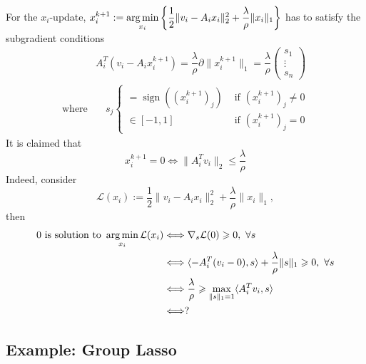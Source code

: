For the $x_i$-update, $x_i^{k+1} := \operatorname*{arg\,min}\limits_{x_i} \left\{ \dfrac{1}{2} \lVert v_i - A_ix_i \rVert_2^2 + \dfrac{\lambda}{\rho} \lVert x_i \rVert_1 \right\}$ has to satisfy the subgradient conditions
\begin{align*}
    & A_i^T (v_i-A_ix_i^{k+1}) = \dfrac{\lambda}{\rho} \partial \lVert x_i^{k+1} \rVert_1 = \dfrac{\lambda}{\rho} \begin{pmatrix} s_1 \\ \vdots \\ s_n \end{pmatrix} \\
    \text{where} & \quad s_j \begin{cases} = \operatorname{sign}((x_i^{k+1})_j) & \text{ if } (x_i^{k+1})_j \neq 0 \\ \in [-1, 1] & \text{ if } (x_i^{k+1})_j = 0 \end{cases}
\end{align*}
It is claimed that
$$x^{k+1}_i = 0 \Longleftrightarrow \lVert A_i^T v_i \rVert_2 \leqslant \dfrac{\lambda}{\rho}$$
Indeed, consider
$$\mathcal{L}(x_i) := \dfrac{1}{2} \lVert v_i - A_ix_i \rVert_2^2 + \dfrac{\lambda}{\rho} \lVert x_i \rVert_1,$$
then
\begin{align*}
    0 \text{ is solution to } \operatorname*{arg\,min}_{x_i} \mathcal{L}(x_i) & \Longleftrightarrow \nabla_s \mathcal{L}(0) \geqslant 0, \ \forall s \\
    & \Longleftrightarrow \langle -A_i^T (v_i - 0), s \rangle + \dfrac{\lambda}{\rho} \lVert s \rVert_1 \geqslant 0, \ \forall s \\
    & \Longleftrightarrow \dfrac{\lambda}{\rho} \geqslant \max\limits_{\lVert s \rVert_1=1} \langle A_i^T v_i, s \rangle \\
    & \Longleftrightarrow ?
\end{align*}


\subsection{Example: Group Lasso}

